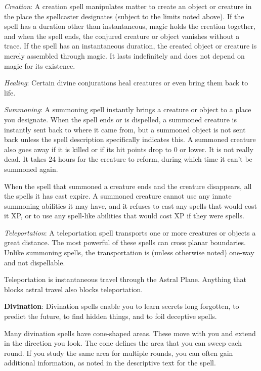 \textit{Creation}: A creation spell manipulates matter to create an object or creature in the place the spellcaster designates (subject to the limits noted above). If the spell has a duration other than instantaneous, magic holds the creation together, and when the spell ends, the conjured creature or object vanishes without a trace. If the spell has an instantaneous duration, the created object or creature is merely assembled through magic. It lasts indefinitely and does not depend on magic for its existence.

\textit{Healing}: Certain divine conjurations heal creatures or even bring them back to life.

\textit{Summoning}: A summoning spell instantly brings a creature or object to a place you designate. When the spell ends or is dispelled, a summoned creature is instantly sent back to where it came from, but a summoned object is not sent back unless the spell description specifically indicates this. A summoned creature also goes away if it is killed or if its hit points drop to 0 or lower. It is not really dead. It takes 24 hours for the creature to reform, during which time it can't be summoned again.

When the spell that summoned a creature ends and the creature disappears, all the spells it has cast expire. A summoned creature cannot use any innate summoning abilities it may have, and it refuses to cast any spells that would cost it XP, or to use any spell-like abilities that would cost XP if they were spells.

\textit{Teleportation}: A teleportation spell transports one or more creatures or objects a great distance. The most powerful of these spells can cross planar boundaries. Unlike summoning spells, the transportation is (unless otherwise noted) one-way and not dispellable.

Teleportation is instantaneous travel through the Astral Plane. Anything that blocks astral travel also blocks teleportation.

\textbf{Divination}: Divination spells enable you to learn secrets long forgotten, to predict the future, to find hidden things, and to foil deceptive spells.

Many divination spells have cone-shaped areas. These move with you and extend in the direction you look. The cone defines the area that you can sweep each round. If you study the same area for multiple rounds, you can often gain additional information, as noted in the descriptive text for the spell.

